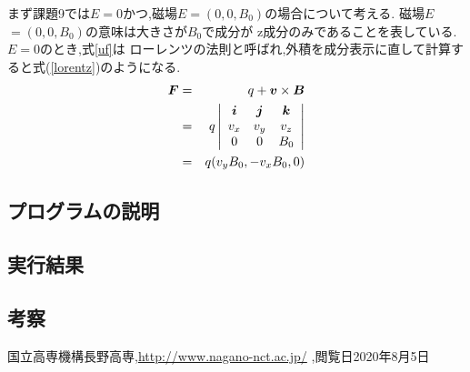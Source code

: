 \documentclass[a4j]{jarticle}
\begin{document}
      まず課題9では\mbox{\boldmath $E$}$=0$かつ,磁場\mbox{\boldmath $E$}$=(0,0,B_0)$の場合について考える.
      磁場\mbox{\boldmath $E$}$=(0,0,B_0)$の意味は大きさが$B_0$で成分が
      z成分のみであることを表している. \mbox{\boldmath $E$}$=0$のとき,式\ref{uf}は
      ローレンツの法則と呼ばれ,外積を成分表示に直して計算すると式(\ref{lorentz})のようになる.
      \begin{eqnarray}
        \mbox{\boldmath $F$} &=& q+\mbox{\boldmath $v$} \times \mbox{\boldmath $B$} \\
        &=& q
        \left|
          \begin{array}{ccc}
            \mbox{\boldmath $i$} & \mbox{\boldmath $j$} & \mbox{\boldmath $k$} \\
            v_x & v_y & v_z \\
            0 & 0 & B_0 
          \end{array}
        \right| \\
        &=& q(v_y B_0,-v_x B_0,0)
      \label{lorentz}
    \end{eqnarray}

      \subsection{プログラムの説明}
      \subsection{実行結果}
      \subsection{考察}


        \begin{thebibliography}{9}
            国立高専機構長野高専,\url{http://www.nagano-nct.ac.jp/} ,閲覧日2020年8月5日
          \end{thebibliography}
\end{document}
